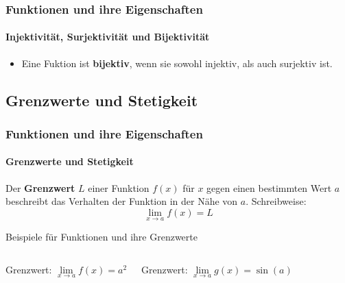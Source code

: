 \documentclass{beamer}
\begin{document}
\begin{frame}
    \frametitle{Funktionen und ihre Eigenschaften}
    \framesubtitle{Injektivität, Surjektivität und Bijektivität}
    \begin{itemize}
        \item Eine Fuktion ist \textbf{bijektiv}, wenn sie sowohl injektiv, als auch surjektiv ist.
    \end{itemize}
\end{frame}

\subsection{Grenzwerte und Stetigkeit}
\begin{frame}
  \frametitle{Funktionen und ihre Eigenschaften}
  \framesubtitle{Grenzwerte und Stetigkeit}

  Der \textbf{Grenzwert} $L$ einer Funktion $f(x)$ für $x$ gegen einen bestimmten Wert $a$ beschreibt das Verhalten der Funktion in der Nähe von $a$.
    Schreibweise: $$\lim_{x \to a} f(x) = L$$
 
\end{frame}

\begin{frame}{Beispiele für Funktionen und ihre Grenzwerte}
  \begin{columns}[c]
   

    \vspace{1em}

    Grenzwert: $\lim\limits_{x \to a} f(x) = a^2$
    
   

    \vspace{1em}

    Grenzwert: $\lim\limits_{x \to a} g(x) = \sin(a)$
  \end{columns}
\end{frame}
\end{document}
